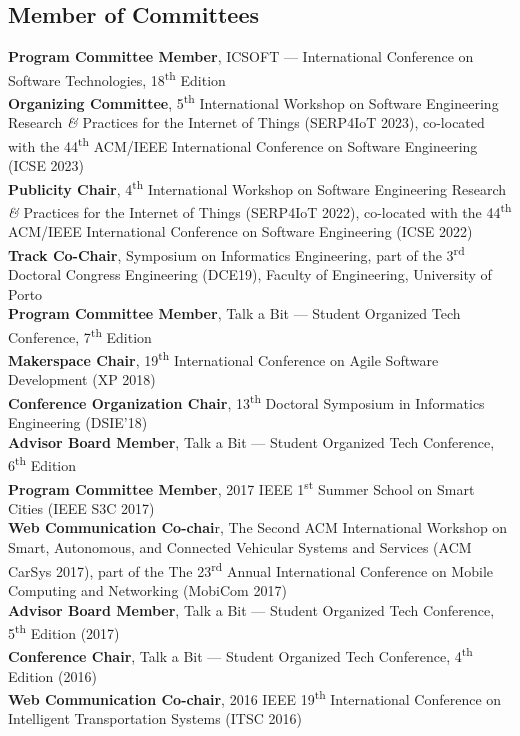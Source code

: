 \documentclass[10pt, a4paper]{article}
\newcommand{\FEUP}{Faculty of Engineering, University of Porto}
\newcommand{\years}[1]{\marginnote{\raggedleft\footnotesize #1}}
\begin{document}
\subsection*{Member of Committees}

\years{2023} 
\textbf{Program Committee Member}, ICSOFT --- International Conference on Software Technologies, 18\textsuperscript{th} Edition\\[0.42em]
\textbf{Organizing Committee}, 5\textsuperscript{th} International Workshop on Software Engineering Research \textit{\&} Practices for the Internet of Things (SERP4IoT 2023), co-located with the 44\textsuperscript{th} ACM/IEEE International Conference on Software Engineering (ICSE 2023)
\\[0.42em]
\years{2022} \textbf{Publicity Chair}, 4\textsuperscript{th} International Workshop on Software Engineering Research \textit{\&} Practices for the Internet of Things (SERP4IoT 2022), co-located with the 44\textsuperscript{th} ACM/IEEE International Conference on Software Engineering (ICSE 2022)
\\[0.42em]
\years{2019} \textbf{Track Co-Chair}, Symposium on Informatics Engineering, part of the 3\textsuperscript{rd} Doctoral Congress Engineering (DCE19), \FEUP
\\[0.42em]
\textbf{Program Committee Member}, Talk a Bit --- Student Organized Tech Conference, 7\textsuperscript{th} Edition
\\[0.42em]
\years{2018} \textbf{Makerspace Chair}, 19\textsuperscript{th} International Conference on Agile Software Development (XP 2018)
\\[0.42em] 
\textbf{Conference Organization Chair}, 13\textsuperscript{th} Doctoral Symposium in Informatics Engineering (DSIE'18)
\\[0.42em] 
\textbf{Advisor Board Member}, Talk a Bit --- Student Organized Tech Conference, 6\textsuperscript{th} Edition
\\[0.42em]
\years{2017} \textbf{Program Committee Member}, 2017 IEEE 1\textsuperscript{st} Summer School on Smart Cities (IEEE S3C 2017)
\\[0.42em]
\textbf{Web Communication Co-chai}r, The Second ACM International Workshop on Smart, Autonomous, and Connected Vehicular Systems and Services (ACM CarSys 2017), part of the The 23\textsuperscript{rd} Annual International Conference on Mobile Computing and Networking (MobiCom 2017)
\\[0.42em]
\textbf{Advisor Board Member}, Talk a Bit --- Student Organized Tech Conference, 5\textsuperscript{th} Edition (2017)
\\[0.42em]
\years{2016} \textbf{Conference Chair}, Talk a Bit --- Student Organized Tech Conference, 4\textsuperscript{th} Edition (2016)
\\[0.42em]
\textbf{Web Communication Co-chair}, 2016 IEEE 19\textsuperscript{th} International Conference on Intelligent Transportation Systems (ITSC 2016)
\end{document}
